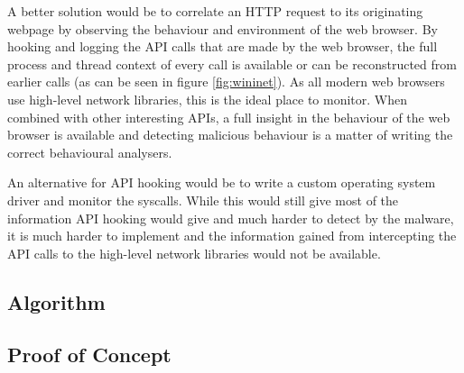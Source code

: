 A better solution would be to correlate an HTTP request to its originating webpage by observing the behaviour and environment of the web browser. By hooking and logging the API calls that are made by the web browser, the full process and thread context of every call is available or can be reconstructed from earlier calls (as can be seen in figure \ref{fig:wininet}). As all modern web browsers use high-level network libraries, this is the ideal place to monitor. When combined with other interesting APIs, a full insight in the behaviour of the web browser is available and detecting malicious behaviour is a matter of writing the correct behavioural analysers.

An alternative for API hooking would be to write a custom operating system driver and monitor the syscalls. While this would still give most of the information API hooking would give and much harder to detect by the malware, it is much harder to implement and the information gained from intercepting the API calls to the high-level network libraries would not be available.

\subsection{Algorithm}


\subsection{Proof of Concept}

